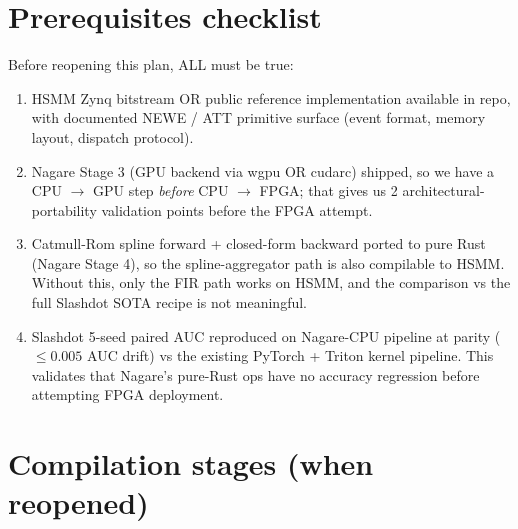 \documentclass[11pt]{article}
\begin{document}
\section{Prerequisites checklist}

Before reopening this plan, ALL must be true:

\begin{enumerate}
  \item HSMM Zynq bitstream OR public reference implementation
    available in repo, with documented NEWE / ATT primitive
    surface (event format, memory layout, dispatch protocol).
  \item Nagare Stage 3 (GPU backend via wgpu OR cudarc) shipped,
    so we have a CPU $\to$ GPU step \emph{before} CPU $\to$ FPGA;
    that gives us 2 architectural-portability validation points
    before the FPGA attempt.
  \item Catmull-Rom spline forward + closed-form backward ported
    to pure Rust (Nagare Stage 4), so the spline-aggregator path
    is also compilable to HSMM. Without this, only the FIR path
    works on HSMM, and the comparison vs the full Slashdot
    SOTA recipe is not meaningful.
  \item Slashdot 5-seed paired AUC reproduced on Nagare-CPU
    pipeline at parity ($\le 0.005$ AUC drift) vs the existing
    PyTorch + Triton kernel pipeline. This validates that Nagare's
    pure-Rust ops have no accuracy regression before attempting
    FPGA deployment.
\end{enumerate}

\section{Compilation stages (when reopened)}
\end{document}
